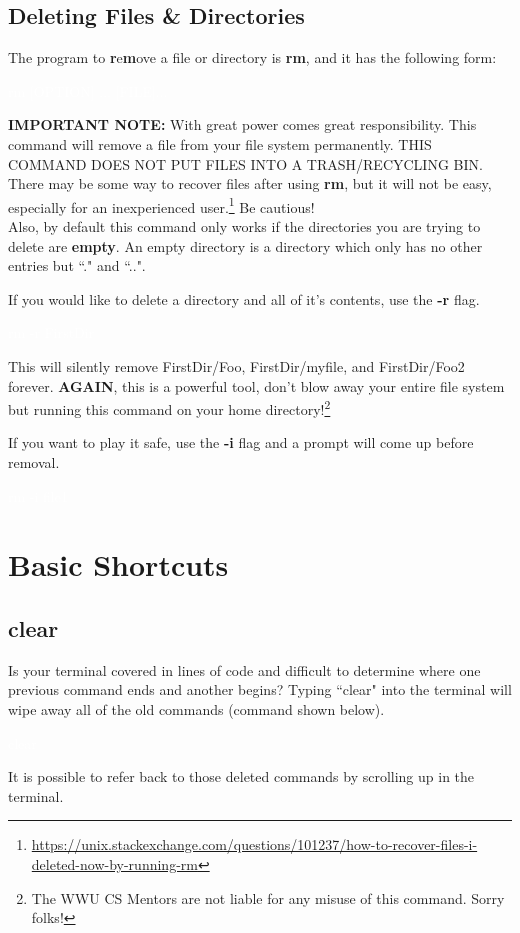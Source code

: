 \documentclass[oneside]{book}
\newcommand{\commandline}[1]{\begin{center} \colorbox{Dark}{\textcolor{white}{#1}} \end{center}}
\begin{document}
\subsection{Deleting Files \& Directories}
The program to \textbf{r}e\textbf{m}ove a file or directory is \textbf{rm}, and it has the following form:
\commandline{rm [OPTION] ... [FILE]...}

\textbf{IMPORTANT NOTE:} With great power comes great responsibility. This command will remove a file from your file system permanently. THIS COMMAND DOES NOT PUT FILES INTO A TRASH/RECYCLING BIN. There may be some way to recover files after using \textbf{rm}, but it will not be easy, especially for an inexperienced user.\footnote{\url{https://unix.stackexchange.com/questions/101237/how-to-recover-files-i-deleted-now-by-running-rm}} Be cautious! \\

Also, by default this command only works if the directories you are trying to delete are \textbf{empty}. An empty directory is a directory which only has no other entries but ``." and ``..".

If you would like to delete a directory and all of it's contents, use the \textbf{-r} flag.\\
\commandline{rm -r FirstDir} 

This will silently remove FirstDir/Foo, FirstDir/myfile, and FirstDir/Foo2 forever. \textbf{AGAIN}, this is a powerful tool, don't blow away your entire file system but running this command on your home directory!\footnote{The WWU CS Mentors are not liable for any misuse of this command. Sorry folks!} 

If you want to play it safe, use the \textbf{-i} flag and a prompt will come up before removal.\ 
\commandline{rm -i file1}

\section{Basic Shortcuts}

\subsection{clear}
Is your terminal covered in lines of code and difficult to determine where one previous command ends and another begins? Typing ``clear" into the terminal will wipe away all of the old commands (command shown below).
\commandline{clear}
It is possible to refer back to those deleted commands by scrolling up in the terminal.
\end{document}
